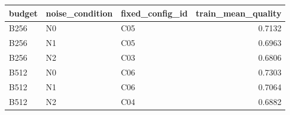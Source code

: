 \begin{tabular}{lllr}
\toprule
budget & noise_condition & fixed_config_id & train_mean_quality \\
\midrule
B256 & N0 & C05 & 0.7132 \\
B256 & N1 & C05 & 0.6963 \\
B256 & N2 & C03 & 0.6806 \\
B512 & N0 & C06 & 0.7303 \\
B512 & N1 & C06 & 0.7064 \\
B512 & N2 & C04 & 0.6882 \\
\bottomrule
\end{tabular}

